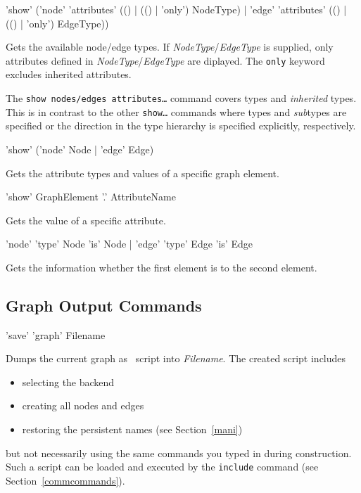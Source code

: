 \begin{rail}
  'show' ('node' 'attributes' (() | (() | 'only') NodeType) | 'edge' 'attributes' (() | (() | 'only') EdgeType))
\end{rail}
Gets the available node/edge  types. If \emph{NodeType}/\emph{EdgeType} is supplied, only attributes defined in \emph{NodeType}/\emph{EdgeType} are diplayed. The \texttt{only} keyword excludes inherited attributes.\\
\begin{note}
The \texttt{show nodes/edges attributes\dots} command covers types and \emph{inherited} types. This is in contrast to the other \texttt{show\dots} commands where types and \emph{sub}types are specified or the direction in the type hierarchy is specified explicitly, respectively.
\end{note}

\begin{rail}
 'show' ('node' Node | 'edge' Edge)
\end{rail}
Gets the attribute types and values of a specific graph element.

\begin{rail}
  'show' GraphElement '.' AttributeName
\end{rail}
Gets the value of a specific attribute.

\begin{rail}
  'node' 'type' Node 'is' Node | 'edge' 'type' Edge 'is' Edge
\end{rail}
Gets the information whether the first element is  to the second element.


\subsection{Graph Output Commands}
\label{outputcmds}

\begin{rail}
  'save' 'graph' Filename
\end{rail}
Dumps the current graph as \GrShell\ script into \emph{Filename}. The created script includes
\begin{itemize}
  \item selecting the backend
  \item creating all nodes and edges
  \item restoring the persistent names (see Section~\ref{mani})
\end{itemize}
but not necessarily using the same commands you typed in during construction. 
Such a script can be loaded and executed by the \texttt{include} command (see Section~\ref{commcommands}).

